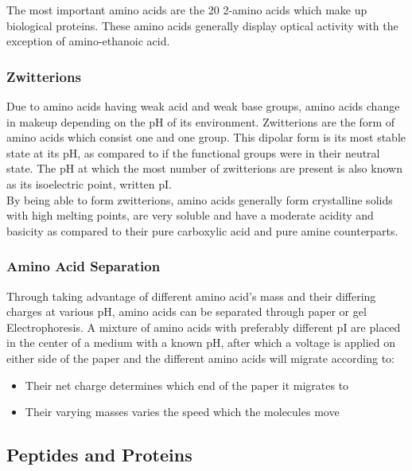 \documentclass[../main]{subfiles}
\begin{document}
	The most important amino acids are the 20 2-amino acids which make up biological proteins. These amino acids generally display optical activity with the exception of amino-ethanoic acid. \\

	\subsubsection{Zwitterions}

	Due to amino acids having weak acid and weak base groups, amino acids change in makeup depending on the pH of its environment. Zwitterions are the form of amino acids which consist one  and one  group. This dipolar form is its most stable state at its pH, as compared to if the functional groups were in their neutral state. The pH at which the most number of zwitterions are present is also known as its isoelectric point, written pI.\\ 

	By being able to form zwitterions, amino acids generally form crystalline solids with high melting points, are very soluble and have a moderate acidity and basicity as compared to their pure carboxylic acid and pure amine counterparts. \\

	\subsubsection{Amino Acid Separation}

	Through taking advantage of different amino acid's mass and their differing charges at various pH, amino acids can be separated through paper or gel Electrophoresis. A mixture of amino acids with preferably  different pI are placed in the center of a medium with a known pH, after which a voltage is applied on either side of the paper and the different amino acids will migrate according to:

	\begin{itemize}
		\item Their net charge determines which end of the paper it migrates to 
		\item Their varying masses varies the speed which the molecules move
	\end{itemize}

	\subsection{Peptides and Proteins}
\end{document}

